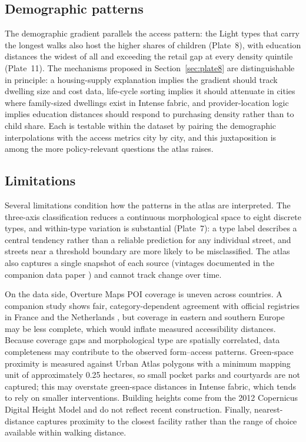 \documentclass[review,authoryear]{elsarticle}
\begin{document}
\subsection{Demographic patterns}

The demographic gradient parallels the access pattern: the Light types that carry the longest walks also host the higher shares of children (Plate~8), with education distances the widest of all and exceeding the retail gap at every density quintile (Plate~11). The mechanisms proposed in Section~\ref{sec:plate8} are distinguishable in principle: a housing-supply explanation implies the gradient should track dwelling size and cost data, life-cycle sorting implies it should attenuate in cities where family-sized dwellings exist in Intense fabric, and provider-location logic implies education distances should respond to purchasing density rather than to child share. Each is testable within the dataset by pairing the demographic interpolations with the access metrics city by city, and this juxtaposition is among the more policy-relevant questions the atlas raises.

\subsection{Limitations}

Several limitations condition how the patterns in the atlas are interpreted. The three-axis classification reduces a continuous morphological space to eight discrete types, and within-type variation is substantial (Plate~7): a type label describes a central tendency rather than a reliable prediction for any individual street, and streets near a threshold boundary are more likely to be misclassified. The atlas also captures a single snapshot of each source (vintages documented in the companion data paper \citep{simons2024soar}) and cannot track change over time.

On the data side, Overture Maps POI coverage is uneven across countries. A companion study shows fair, category-dependent agreement with official registries in France and the Netherlands \citep{simons2024soar}, but coverage in eastern and southern Europe may be less complete, which would inflate measured accessibility distances. Because coverage gaps and morphological type are spatially correlated, data completeness may contribute to the observed form--access patterns. Green-space proximity is measured against Urban Atlas polygons with a minimum mapping unit of approximately 0.25 hectares, so small pocket parks and courtyards are not captured; this may overstate green-space distances in Intense fabric, which tends to rely on smaller interventions. Building heights come from the 2012 Copernicus Digital Height Model and do not reflect recent construction. Finally, nearest-distance captures proximity to the closest facility rather than the range of choice available within walking distance.
\end{document}
